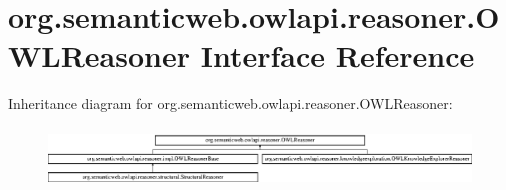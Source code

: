 \hypertarget{interfaceorg_1_1semanticweb_1_1owlapi_1_1reasoner_1_1_o_w_l_reasoner}{\section{org.\-semanticweb.\-owlapi.\-reasoner.\-O\-W\-L\-Reasoner Interface Reference}
\label{interfaceorg_1_1semanticweb_1_1owlapi_1_1reasoner_1_1_o_w_l_reasoner}
}
Inheritance diagram for org.\-semanticweb.\-owlapi.\-reasoner.\-O\-W\-L\-Reasoner\-:\begin{figure}[H]
\begin{center}
\leavevmode
\includegraphics[height=1.578947cm]{interfaceorg_1_1semanticweb_1_1owlapi_1_1reasoner_1_1_o_w_l_reasoner}
\end{center}
\end{figure}
